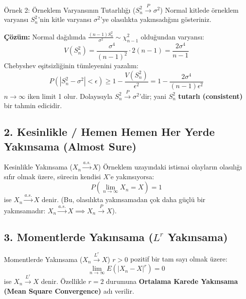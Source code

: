 \documentclass[12pt,a4paper]{article}
\begin{document}
\begin{ornek}{Örnek 2: Örneklem Varyansının Tutarlılığı ($S_n^2 \xrightarrow{P} \sigma^2$)}
Normal kitlede örneklem varyansı $S_n^2$'nin kitle varyansı $\sigma^2$'ye olasılıkta yakınsadığını gösteriniz.

\bigskip
\textbf{Çözüm:}
Normal dağılımda $\frac{(n-1)S_n^2}{\sigma^2} \sim \chi^2_{n-1}$ olduğundan varyansı:
\begin{equation}
    V(S_n^2) = \frac{\sigma^4}{(n-1)^2} \cdot 2(n-1) = \frac{2\sigma^4}{n-1}
\end{equation}
Chebyshev eşitsizliğinin tümleyenini yazalım:
\begin{equation}
    P\left( |S_n^2 - \sigma^2| < \epsilon \right) \ge 1 - \frac{V(S_n^2)}{\epsilon^2} = 1 - \frac{2\sigma^4}{(n-1)\epsilon^2}
\end{equation}
$n \to \infty$ iken limit 1 olur. Dolayısıyla $S_n^2 \xrightarrow{P} \sigma^2$'dir; yani $S_n^2$ \textbf{tutarlı (consistent)} bir tahmin edicidir.
\end{ornek}

\subsection{2. Kesinlikle / Hemen Hemen Her Yerde Yakınsama (Almost Sure)}

\begin{tanim}{Kesinlikle Yakınsama ($X_n \xrightarrow{a.s.} X$)}
Örneklem uzayındaki istisnai olayların olasılığı sıfır olmak üzere, sürecin kendisi $X$'e yakınsıyorsa:
\begin{equation}
    P\left( \lim_{n \to \infty} X_n = X \right) = 1
\end{equation}
ise $X_n \xrightarrow{a.s.} X$ denir. (Bu, olasılıkta yakınsamadan çok daha güçlü bir yakınsamadır: $X_n \xrightarrow{a.s.} X \implies X_n \xrightarrow{P} X$).
\end{tanim}

\subsection{3. Momentlerde Yakınsama (\texorpdfstring{$L^r$ Yakınsama}{Lr Yakınsama})}

\begin{tanim}{Momentlerde Yakınsama ($X_n \xrightarrow{L^r} X$)}
$r > 0$ pozitif bir tam sayı olmak üzere:
\begin{equation}
    \lim_{n \to \infty} E\left( |X_n - X|^r \right) = 0
\end{equation}
ise $X_n \xrightarrow{L^r} X$ denir. Özellikle $r=2$ durumuna \textbf{Ortalama Karede Yakınsama (Mean Square Convergence)} adı verilir.
\end{tanim}
\end{document}
